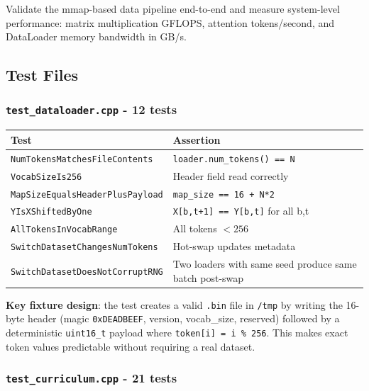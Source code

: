 \documentclass[12pt, a4paper]{article}
\begin{document}
\begin{tcolorbox}[designbox, title={Step 5.2 Goal}]
  Validate the mmap-based data pipeline end-to-end and measure system-level
  performance: matrix multiplication GFLOPS, attention tokens/second, and
  DataLoader memory bandwidth in GB/s.
\end{tcolorbox}

\subsection{Test Files}

\subsubsection{\texttt{test\_dataloader.cpp} - 12 tests}

\begin{table}[!ht]
\centering
\renewcommand{\arraystretch}{1.3}
\begin{tabular}{@{} l p{12cm} @{}}
\toprule
\textbf{Test} & \textbf{Assertion} \\
\midrule
\texttt{NumTokensMatchesFileContents} & \texttt{loader.num\_tokens() == N} \\
\texttt{VocabSizeIs256}               & Header field read correctly \\
\texttt{MapSizeEqualsHeaderPlusPayload} & \texttt{map\_size == 16 + N*2} \\
\texttt{YIsXShiftedByOne}             & \texttt{X[b,t+1] == Y[b,t]} for all b,t \\
\texttt{AllTokensInVocabRange}        & All tokens $< 256$ \\
\texttt{SwitchDatasetChangesNumTokens} & Hot-swap updates metadata \\
\texttt{SwitchDatasetDoesNotCorruptRNG} & Two loaders with same seed produce same batch post-swap \\
\bottomrule
\end{tabular}
\end{table}

\textbf{Key fixture design}: the test creates a valid \texttt{.bin} file in
\texttt{/tmp} by writing the 16-byte header (magic \texttt{0xDEADBEEF}, version,
vocab\_size, reserved) followed by a deterministic \texttt{uint16\_t} payload
where \texttt{token[i] = i \% 256}.  This makes exact token values predictable
without requiring a real dataset.

\subsubsection{\texttt{test\_curriculum.cpp} - 21 tests}
\end{document}
